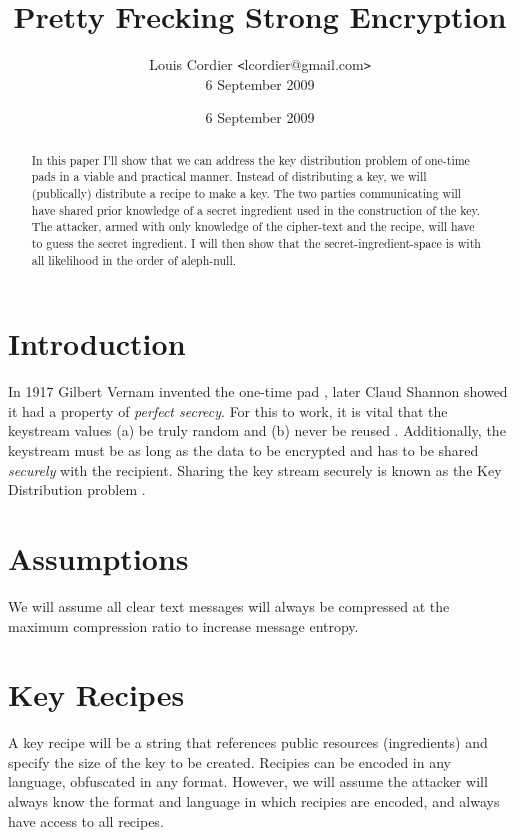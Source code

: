 \documentclass[10pt,conference,a4article]{IEEEtran}
\begin{document}
\title{Pretty Frecking Strong Encryption}
\author{Louis Cordier {\tt<}lcordier@gmail.com{\tt>}\\6 September 2009}
\date{6 September 2009}
\maketitle

\begin{abstract}
In this paper I'll show that we can address the key distribution 
problem of one-time pads in a viable and practical manner. Instead
of distributing a key, we will (publically) distribute a recipe to
make a key. The two parties communicating will have shared prior
knowledge of a secret ingredient used in the construction of the
key. The attacker, armed with only knowledge of the cipher-text and
the recipe, will have to guess the secret ingredient. I will then show
that the secret-ingredient-space is with all likelihood in the order 
of aleph-null.
\end{abstract}

\section{Introduction}
In 1917 Gilbert Vernam invented the one-time pad \cite{OTP}, later
Claud Shannon showed it had a property of {\em perfect secrecy}.
For this to work, it is vital that the keystream values (a) be truly
random and (b) never be reused \cite{OTPblog}. Additionally, the keystream
must be as long as the data to be encrypted and has to be
shared {\em securely} with the recipient. Sharing the key stream 
securely is known as the Key Distribution problem \cite{KeyDistribution}.

\section{Assumptions}
We will assume all clear text messages will always be compressed
at the maximum compression ratio to increase message entropy.

\section{Key Recipes}
A key recipe will be a string that references public resources (ingredients)
and specify the size of the key to be created. Recipies can be encoded
in any language, obfuscated in any format. However, we will assume the 
attacker will always know the format and language in which recipies are
encoded, and always have access to all recipes. 
\end{document}
